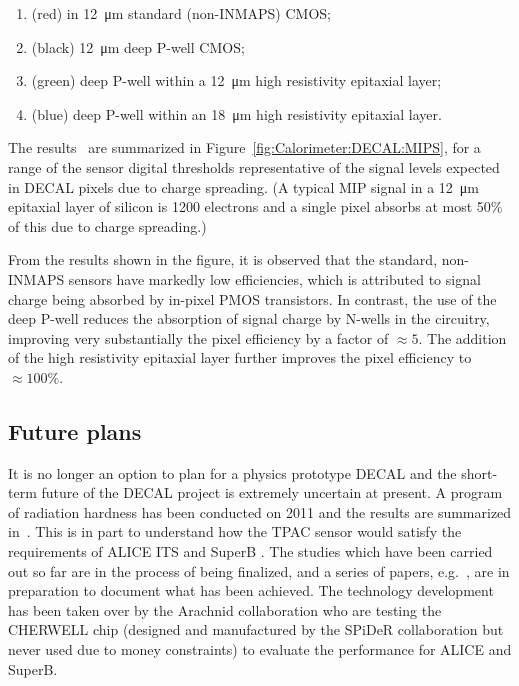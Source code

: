 \begin{enumerate}
\item (red) in \SI{12}{\micro\meter} standard (non-INMAPS) CMOS;
\item (black) \SI{12}{\micro\meter} deep P-well CMOS;
\item (green) deep P-well within a \SI{12}{\micro\meter} high resistivity epitaxial layer;
\item (blue) deep P-well within an \SI{18}{\micro\meter} high resistivity epitaxial layer.
\end{enumerate}

The results~\cite{Dauncey:2010zz} are summarized in Figure~\ref{fig:Calorimeter:DECAL:MIPS}, for a range of the sensor digital thresholds representative of the signal levels expected in DECAL pixels due to charge spreading. (A typical MIP signal in a \SI{12}{\micro\meter} epitaxial layer of silicon is 1200 electrons and a single pixel absorbs at most 50\% of this due to charge spreading.)

From the results shown in the figure, it is observed that the standard, non-INMAPS sensors have markedly low efficiencies, which is attributed to signal charge being absorbed by in-pixel PMOS transistors. In contrast, the use of the deep P-well reduces the absorption of signal charge by N-wells in the circuitry, improving very substantially the pixel efficiency by a factor of $\approx 5$. The addition of the high resistivity epitaxial layer further improves the pixel efficiency to $\approx 100\%$.

\subsection{Future plans}
It is no longer an option to plan for a physics prototype DECAL and the short-term future of the DECAL project is extremely uncertain at present. A program of radiation hardness has been conducted on 2011 and the results are summarized in~\cite{Price:2012vta,Price:2013js}. This is in part to understand how the TPAC sensor would satisfy the requirements of ALICE ITS and SuperB . The studies which have been carried out so far are in the process of being finalized, and a series of papers, e.g.~\cite{Ballin:2011jq}, are in preparation to document what has been achieved. The technology development has been taken over by the Arachnid collaboration who are testing the CHERWELL chip (designed and manufactured by the SPiDeR collaboration but never used due to money constraints) to evaluate the performance for ALICE and SuperB.
